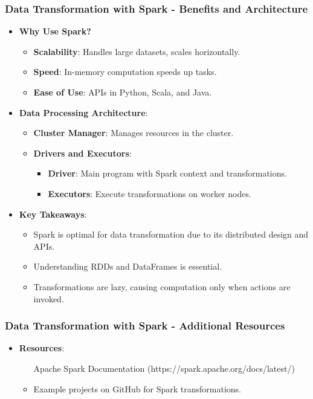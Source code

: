 \documentclass[aspectratio=169]{beamer}
\begin{document}
\begin{frame}[fragile]
    \frametitle{Data Transformation with Spark - Benefits and Architecture}
    \begin{itemize}
        \item \textbf{Why Use Spark?}
            \begin{itemize}
                \item \textbf{Scalability}: Handles large datasets, scales horizontally.
                \item \textbf{Speed}: In-memory computation speeds up tasks.
                \item \textbf{Ease of Use}: APIs in Python, Scala, and Java.
            \end{itemize}
        \item \textbf{Data Processing Architecture}:
            \begin{itemize}
                \item \textbf{Cluster Manager}: Manages resources in the cluster.
                \item \textbf{Drivers and Executors}: 
                    \begin{itemize}
                        \item \textbf{Driver}: Main program with Spark context and transformations.
                        \item \textbf{Executors}: Execute transformations on worker nodes.
                    \end{itemize}
            \end{itemize}
        \item \textbf{Key Takeaways}:
            \begin{itemize}
                \item Spark is optimal for data transformation due to its distributed design and APIs.
                \item Understanding RDDs and DataFrames is essential.
                \item Transformations are lazy, causing computation only when actions are invoked.
            \end{itemize}
    \end{itemize}
\end{frame}

\begin{frame}
    \frametitle{Data Transformation with Spark - Additional Resources}
    \begin{itemize}
        \item \textbf{Resources}:
            \begin{itemize}
                \item [Apache Spark Documentation](https://spark.apache.org/docs/latest/)
                \item Example projects on GitHub for Spark transformations.
            \end{itemize}
    \end{itemize}
\end{frame}
\end{document}
